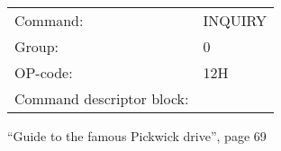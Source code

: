 %
%  
\begin{figure}[h]
  \sf
  \begin{tabular}{ll}
    Command:                  & INQUIRY \\
    Group:                    & 0       \\
    OP-code:                  & 12H     \\
    Command descriptor block: &         \\
  \end{tabular}
  {
    \footnotesize \sf
    
  }
  \caption{``Guide to the famous Pickwick drive'', page 69}
  \label{pic:pwguide1}
\end{figure}
